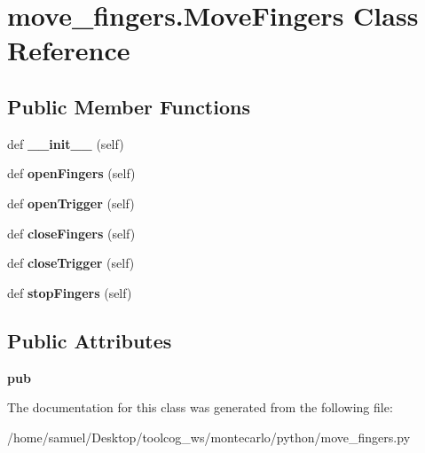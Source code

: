 \hypertarget{classmove__fingers_1_1MoveFingers}{}\section{move\+\_\+fingers.\+Move\+Fingers Class Reference}
\label{classmove__fingers_1_1MoveFingers}
\subsection*{Public Member Functions}
\begin{DoxyCompactItemize}
\item 
\mbox{\label{classmove__fingers_1_1MoveFingers_ac26eb41f09acd1d29f395a5649b4403f}} 
def {\bfseries \+\_\+\+\_\+init\+\_\+\+\_\+} (self)
\item 
\mbox{\label{classmove__fingers_1_1MoveFingers_a999e4869c8a5bf42e29d490f67a82516}} 
def {\bfseries open\+Fingers} (self)
\item 
\mbox{\label{classmove__fingers_1_1MoveFingers_ab8f25216fbc15f7dec7ee0730a8051ec}} 
def {\bfseries open\+Trigger} (self)
\item 
\mbox{\label{classmove__fingers_1_1MoveFingers_ac43323a6d04eba138aa94ec0d4cfcc4d}} 
def {\bfseries close\+Fingers} (self)
\item 
\mbox{\label{classmove__fingers_1_1MoveFingers_a3c7a6505ef6858d5ad59355a8f195a10}} 
def {\bfseries close\+Trigger} (self)
\item 
\mbox{\label{classmove__fingers_1_1MoveFingers_ad7e2c7ae218593a274042a772464ceea}} 
def {\bfseries stop\+Fingers} (self)
\end{DoxyCompactItemize}
\subsection*{Public Attributes}
\begin{DoxyCompactItemize}
\item 
\mbox{\label{classmove__fingers_1_1MoveFingers_aa4da3af73d110c5dda41c6afcdad0b8d}} 
{\bfseries pub}
\end{DoxyCompactItemize}


The documentation for this class was generated from the following file\+:\begin{DoxyCompactItemize}
\item 
/home/samuel/\+Desktop/toolcog\+\_\+ws/montecarlo/python/move\+\_\+fingers.\+py\end{DoxyCompactItemize}
